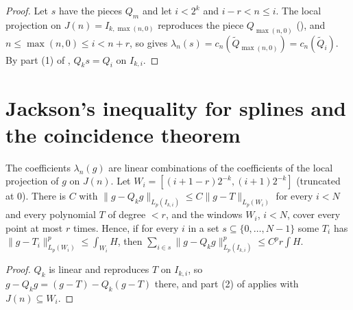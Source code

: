 \begin{proof}
\leanok
Let $s$ have the pieces $Q_m$ and let $i < 2^k$ and $i - r < n \leq i$. The local projection on
$J(n) = I_{k, \max(n, 0)}$ reproduces the piece $Q_{\max(n,0)}$ (), and
$n \leq \max(n, 0) \leq i < n + r$, so  gives
$\lambda_n(s) = c_n(\tilde Q_{\max(n,0)}) = c_n(\tilde Q_i)$. By part (1) of
, $Q_k s = Q_i$ on $I_{k,i}$.
\end{proof}

\section{Jackson's inequality for splines and the coincidence theorem}
\label{sec:spline-jackson-coincidence}

\begin{lemma}
\label{lem:qi-local-error}
\leanok
{}
The coefficients $\lambda_n(g)$ are linear combinations of the coefficients of the local
projection of $g$ on $J(n)$. Let $W_i = [(i + 1 - r) 2^{-k}, (i + 1) 2^{-k}]$ (truncated at
$0$). There is $C$ with
$\|g - Q_k g\|_{L_p(I_{k,i})} \leq C \|g - T\|_{L_p(W_i)}$ for every $i < N$ and every polynomial
$T$ of degree $< r$, and the windows $W_i$, $i < N$, cover every point at most $r$ times. Hence,
if for every $i$ in a set $s \subseteq \{0, \dots, N - 1\}$ some $T_i$ has
$\|g - T_i\|_{L_p(W_i)}^p \leq \int_{W_i} H$, then
$\sum_{i \in s} \|g - Q_k g\|_{L_p(I_{k,i})}^p \leq C^p r \int H$.
\end{lemma}

\begin{proof}
\leanok
$Q_k$ is linear and reproduces $T$ on $I_{k,i}$, so $g - Q_k g = (g - T) - Q_k(g - T)$ there,
and part (2) of  applies with $J(n) \subseteq W_i$.
\end{proof}


